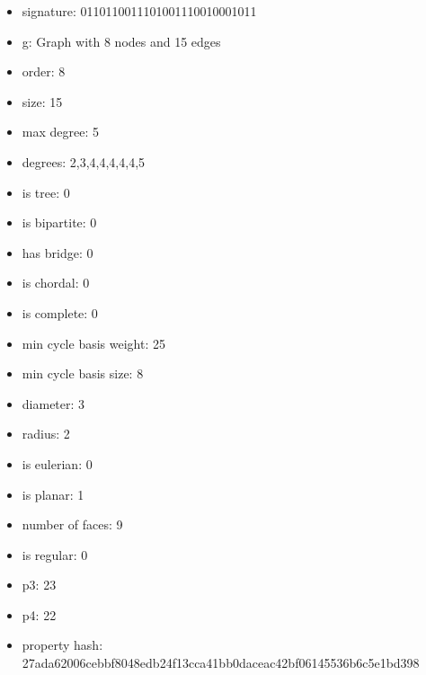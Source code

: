 \begin{itemize}
\item signature: 0110110011101001110010001011
\item g: Graph with 8 nodes and 15 edges
\item order: 8
\item size: 15
\item max degree: 5
\item degrees: 2,3,4,4,4,4,4,5
\item is tree: 0
\item is bipartite: 0
\item has bridge: 0
\item is chordal: 0
\item is complete: 0
\item min cycle basis weight: 25
\item min cycle basis size: 8
\item diameter: 3
\item radius: 2
\item is eulerian: 0
\item is planar: 1
\item number of faces: 9
\item is regular: 0
\item p3: 23
\item p4: 22
\item property hash: 27ada62006cebbf8048edb24f13cca41bb0daceac42bf06145536b6c5e1bd398
\end{itemize}
\newpage
\begin{figure}
\end{figure}
